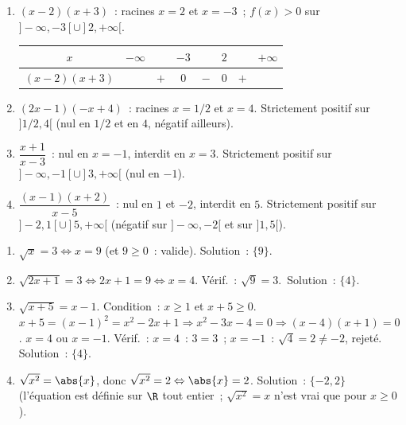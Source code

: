 \begin{enumerate}
  \item $(x-2)(x+3)$~: racines $x=2$ et $x=-3$~; $f(x)>0$ sur $]-\infty,-3[\cup]2,+\infty[$.
\begin{center}\renewcommand{\arraystretch}{1.3}
\begin{tabular}{|c|ccccccc|}
\hline $x$ & $-\infty$ & & $-3$ & & $2$ & & $+\infty$ \\\hline
$(x-2)(x+3)$ & & $+$ & $0$ & $-$ & $0$ & $+$ & \\\hline
\end{tabular}
\end{center}
  \item $(2x-1)(-x+4)$~: racines $x=1/2$ et $x=4$.
        Strictement positif sur $]1/2,4[$ (nul en $1/2$ et en $4$, n\'egatif ailleurs).
  \item $\dfrac{x+1}{x-3}$~: nul en $x=-1$, interdit en $x=3$.
        Strictement positif sur $]-\infty,-1[\cup]3,+\infty[$ (nul en $-1$).
  \item $\dfrac{(x-1)(x+2)}{x-5}$~: nul en $1$ et $-2$, interdit en $5$.
        Strictement positif sur $]-2,1[\cup]5,+\infty[$ (n\'egatif sur $]-\infty,-2[$ et sur $]1,5[$).
\end{enumerate}


\begin{enumerate}
  \item $\sqrt{x}=3 \Leftrightarrow x=9$ (et $9\geq0$~: valide). Solution~: $\{9\}$.
  \item $\sqrt{2x+1}=3 \Leftrightarrow 2x+1=9 \Leftrightarrow x=4$.
        V\'erif.~: $\sqrt{9}=3$.\checkmark\ Solution~: $\{4\}$.
  \item $\sqrt{x+5}=x-1$. Condition~: $x\geq1$ et $x+5\geq0$.
        $x+5=(x-1)^2=x^2-2x+1 \Rightarrow x^2-3x-4=0 \Rightarrow (x-4)(x+1)=0$.
        $x=4$ ou $x=-1$. V\'erif.~: $x=4$~: $3=3$\checkmark~; $x=-1$~: $\sqrt{4}=2\ne-2$, rejet\'e.
        Solution~: $\{4\}$.
  \item $\sqrt{x^2}=\abs{x}$, donc $\sqrt{x^2}=2\Leftrightarrow\abs{x}=2$. Solution~: $\{-2,2\}$
        (l'\'equation est d\'efinie sur $\R$ tout entier~; $\sqrt{x^2}=x$ n'est vrai que pour $x\ge0$).
\end{enumerate}


